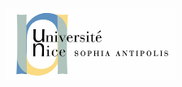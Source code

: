\newcommand{\reporttitle}{Une extension du logiciel GVLE}     %
\newcommand{\reportsubtitle}{Modélisation individu centré}     %
\newcommand{\reportauthor}{Geneviève \textsc{Cirera} (SI4)} %
\newcommand{\reportsubject}{Rapport de Stage 4ème année} %
\newcommand{\HRule}{\rule{\linewidth}{0.5mm}}
\setlength{\parskip}{1ex} %

\begin{titlepage}

\begin{center}

\begin{minipage}[t]{0.49\textwidth}
\vspace*{-2cm}
  \begin{flushleft}
    \includegraphics [width=55mm]{images/LogoUNSA.jpg} \\[0.6cm]
    

\end{flushleft}
\end{minipage}
\end{center}
\end{titlepage}
